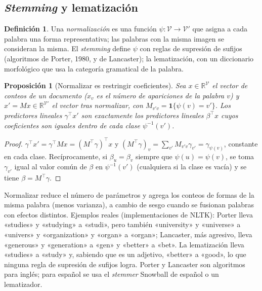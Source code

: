 \documentclass[11pt,a4paper]{article}
\theoremstyle{plain}
\newtheorem{proposicion}[teorema]{Proposición}
\theoremstyle{definition}
\newtheorem{definicion}[teorema]{Definición}
\theoremstyle{remark}
\newcommand{\R}{\mathbb{R}}
\newcommand{\1}{\mathbf{1}}
\newcommand{\ind}[1]{\mathbf{1}\{#1\}}
\begin{document}
\subsection{\emph{Stemming} y lematización}

\begin{definicion}
Una \emph{normalización} es una función $\psi:\mathcal V\to\mathcal V'$ que
asigna a cada palabra una forma representativa; las palabras con la misma
imagen se consideran la misma. El \emph{stemming} define $\psi$ con reglas
de supresión de sufijos (algoritmos de Porter, 1980, y de Lancaster); la
lematización, con un diccionario morfológico que usa la categoría
gramatical de la palabra.
\end{definicion}

\begin{proposicion}[Normalizar es restringir coeficientes]\label{prop:stem}
Sea $x\in\R^{\mathcal V}$ el vector de conteos de un documento ($x_v$ es el
número de apariciones de la palabra $v$) y $x'=Mx\in\R^{\mathcal V'}$ el
vector tras normalizar, con $M_{v'v}=\ind{\psi(v)=v'}$. Los predictores
lineales $\gamma^\top x'$ son exactamente los predictores lineales
$\beta^\top x$ cuyos coeficientes son iguales dentro de cada clase
$\psi^{-1}(v')$.
\end{proposicion}

\begin{proof}
$\gamma^\top x'=\gamma^\top Mx=(M^\top\gamma)^\top x$ y
$(M^\top\gamma)_v=\sum_{v'}M_{v'v}\gamma_{v'}=\gamma_{\psi(v)}$, constante en
cada clase. Recíprocamente, si $\beta_u=\beta_v$ siempre que
$\psi(u)=\psi(v)$, se toma $\gamma_{v'}$ igual al valor común de $\beta$
en $\psi^{-1}(v')$ (cualquiera si la clase es vacía) y se tiene
$\beta=M^\top\gamma$.
\end{proof}

Normalizar reduce el número de parámetros y agrega los conteos de formas
de la misma palabra (menos varianza), a cambio de sesgo cuando se fusionan
palabras con efectos distintos. Ejemplos reales (implementaciones de
NLTK): Porter lleva «studies» y «studying» a «studi», pero también
«university» y «universe» a «univers» y «organization» y «organ» a
«organ»; Lancaster, más agresivo, lleva «generous» y «generation» a
«gen» y «better» a «bet». La lematización lleva «studies» a «study» y,
sabiendo que es un adjetivo, «better» a «good», lo que ninguna regla de
supresión de sufijos logra. Porter y Lancaster son algoritmos para inglés;
para español se usa el \emph{stemmer} Snowball de español o un
lematizador.
\end{document}
